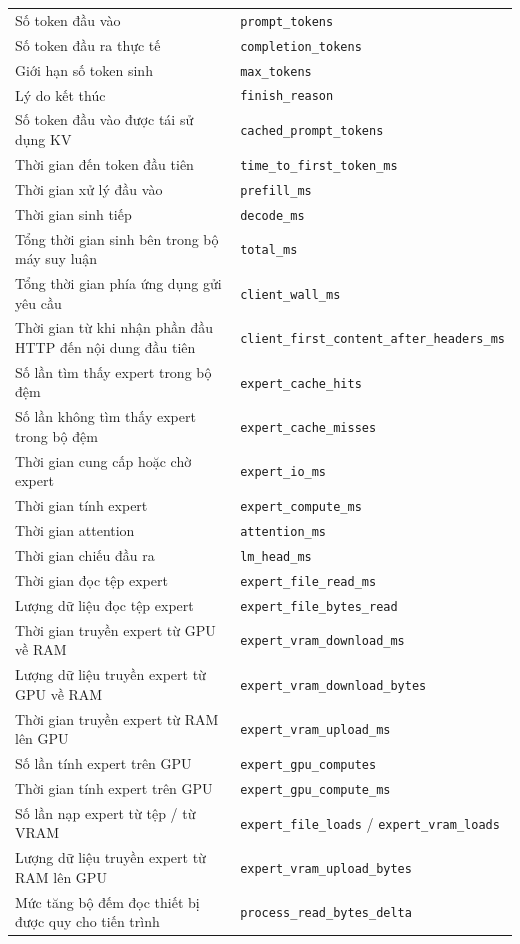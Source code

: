 \begin{longtable}{>{\RaggedRight\arraybackslash}p{6.8cm} >{\RaggedRight\arraybackslash}p{8.7cm}}
Số token đầu vào & \texttt{prompt\_tokens} \\
Số token đầu ra thực tế & \texttt{completion\_tokens} \\
Giới hạn số token sinh & \texttt{max\_tokens} \\
Lý do kết thúc & \texttt{finish\_reason} \\
Số token đầu vào được tái sử dụng KV & \texttt{cached\_prompt\_tokens} \\
Thời gian đến token đầu tiên & \texttt{time\_to\_first\_token\_ms} \\
Thời gian xử lý đầu vào & \texttt{prefill\_ms} \\
Thời gian sinh tiếp & \texttt{decode\_ms} \\
Tổng thời gian sinh bên trong bộ máy suy luận & \texttt{total\_ms} \\
Tổng thời gian phía ứng dụng gửi yêu cầu & \texttt{client\_wall\_ms} \\
Thời gian từ khi nhận phần đầu HTTP đến nội dung đầu tiên & \texttt{client\_first\_content\_after\_headers\_ms} \\
Số lần tìm thấy expert trong bộ đệm & \texttt{expert\_cache\_hits} \\
Số lần không tìm thấy expert trong bộ đệm & \texttt{expert\_cache\_misses} \\
Thời gian cung cấp hoặc chờ expert & \texttt{expert\_io\_ms} \\
Thời gian tính expert & \texttt{expert\_compute\_ms} \\
Thời gian attention & \texttt{attention\_ms} \\
Thời gian chiếu đầu ra & \texttt{lm\_head\_ms} \\
Thời gian đọc tệp expert & \texttt{expert\_file\_read\_ms} \\
Lượng dữ liệu đọc tệp expert & \texttt{expert\_file\_bytes\_read} \\
Thời gian truyền expert từ GPU về RAM & \texttt{expert\_vram\_download\_ms} \\
Lượng dữ liệu truyền expert từ GPU về RAM & \texttt{expert\_vram\_download\_bytes} \\
Thời gian truyền expert từ RAM lên GPU & \texttt{expert\_vram\_upload\_ms} \\
Số lần tính expert trên GPU & \texttt{expert\_gpu\_computes} \\
Thời gian tính expert trên GPU & \texttt{expert\_gpu\_compute\_ms} \\
Số lần nạp expert từ tệp / từ VRAM & \texttt{expert\_file\_loads} / \texttt{expert\_vram\_loads} \\
Lượng dữ liệu truyền expert từ RAM lên GPU & \texttt{expert\_vram\_upload\_bytes} \\
Mức tăng bộ đếm đọc thiết bị được quy cho tiến trình & \texttt{process\_read\_bytes\_delta} \\

\end{longtable}
\endgroup


